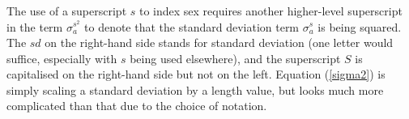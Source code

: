 \begin{frame}
\frametitle{}
\bi
  \item
\ei
\end{frame}

The use of a superscript $s$ to index sex requires another higher-level
superscript in the term $\sigma_a^{s^2}$ to denote that the standard deviation
term $\sigma_a^s$ is being squared. The $sd$ on the right-hand side stands for
standard deviation (one letter would suffice, especially with $s$ being used
elsewhere), and the superscript $S$ is capitalised on the right-hand side but not
on the left. Equation (\ref{sigma2}) is simply scaling a standard deviation by
a length value, but looks much more complicated than that due to the choice
of notation.
